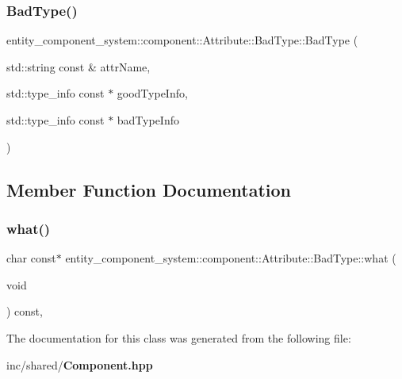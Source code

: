 \subsubsection{Bad\+Type()}
{\footnotesize\ttfamily entity\+\_\+component\+\_\+system\+::component\+::\+Attribute\+::\+Bad\+Type\+::\+Bad\+Type (\begin{DoxyParamCaption}\item[{std\+::string const \&}]{attr\+Name,  }\item[{std\+::type\+\_\+info const $\ast$}]{good\+Type\+Info,  }\item[{std\+::type\+\_\+info const $\ast$}]{bad\+Type\+Info }\end{DoxyParamCaption})\hspace{0.3cm}{\ttfamily [inline]}}



\subsection{Member Function Documentation}
\label{classentity__component__system_1_1component_1_1_attribute_1_1_bad_type_a88b99896f90958debc2e53f7fa638996} 
\subsubsection{what()}
{\footnotesize\ttfamily char const$\ast$ entity\+\_\+component\+\_\+system\+::component\+::\+Attribute\+::\+Bad\+Type\+::what (\begin{DoxyParamCaption}\item[{void}]{ }\end{DoxyParamCaption}) const\hspace{0.3cm}{\ttfamily [inline]}, {\ttfamily [noexcept]}}



The documentation for this class was generated from the following file\+:\begin{DoxyCompactItemize}
\item 
inc/shared/{\bf Component.\+hpp}\end{DoxyCompactItemize}
